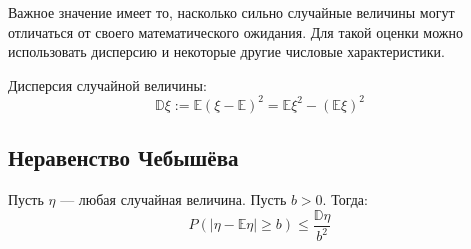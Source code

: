 Важное значение имеет то, насколько сильно случайные величины могут отличаться от своего математического ожидания. Для такой оценки можно использовать дисперсию и некоторые другие числовые характеристики.

\begin{definition}[Дисперсия]
    Дисперсия случайной величины:
    \begin{equation}
        \mathbb{D} \xi := \mathbb{E}(\xi - \mathbb{E})^2 = \mathbb{E} \xi^2 - (\mathbb{E}\xi)^2
    \end{equation}
\end{definition}

\subsection{Неравенство Чебышёва}

\begin{theorem}
    Пусть $\eta$ --- любая случайная величина. Пусть $b>0$. Тогда:
    \begin{equation}
        P(|\eta - \mathbb{E} \eta| \geq b) \leq \frac{\mathbb{D}\eta}{b^2}    
    \end{equation}
\end{theorem}

\newpage